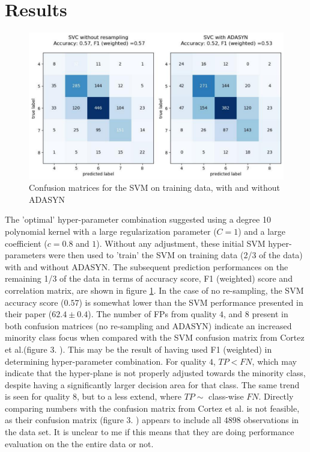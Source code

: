 \documentclass[%
oneside,                 %
final,                   %
10pt]{article}
\begin{document}
\section{Results} \label{Section_Results} \label{results}
\begin{figure}[!h]
        \centering 
         \includegraphics[scale=0.5]{../Results/confusions_SVM.pdf} 
        \caption{Confusion matrices for the SVM on training data, with and without ADASYN}
        \label{fig:conf_SVM}   
\end{figure}  
The 'optimal' hyper-parameter combination suggested using a degree 10 polynomial kernel with a large regularization parameter ($C=1$) and a large coefficient ($c =0.8$ and $1$).
Without any adjustment, these initial SVM hyper-parameters were then used to 'train' the SVM on training data (2/3 of the data) with and without ADASYN. The subsequent prediction performances on the remaining 1/3 of the data in terms of accuracy score, F1 (weighted) score and correlation matrix, are shown in figure \ref{fig:conf_SVM}. In the case of no re-sampling, the SVM accuracy score ($0.57$) is somewhat lower than the SVM performance presented in their paper ($62.4 \pm 0.4$)\citep{CortezPaulo}. The number of FPs from quality $4$, and $8$ present in both confusion matrices (no re-sampling and ADASYN) indicate an increased minority class focus when compared with the SVM confusion matrix from Cortez et al.(figure 3. \citep{CortezPaulo}). This may be the result of having used F1 (weighted) in determining hyper-parameter combination. For quality $4$, $TP<FN$, which may indicate that the hyper-plane is not properly adjusted towards the minority class, despite having a significantly larger decision area for that class. The same trend is seen for quality $8$, but to a less extend, where $TP\sim$ class-wise $FN$. Directly comparing numbers with the confusion matrix from Cortez et al. is not feasible, as their confusion matrix (figure 3. \citep{CortezPaulo}) appears to include all $4898$ observations in the data set. It is unclear to me if this means that they are doing performance evaluation on the the entire data or not. 
\end{document}
